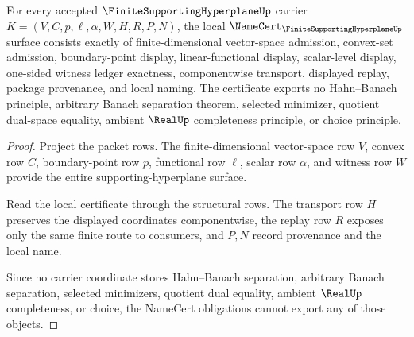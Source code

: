 \begin{theorem}
\label{thm:finite-supporting-hyperplane-obligations}
For every accepted $\FiniteSupportingHyperplaneUp$ carrier $K=(V,C,p,\ell,\alpha,W,H,R,P,N)$, the local $\NameCert_{\FiniteSupportingHyperplaneUp}$ surface consists exactly of finite-dimensional vector-space admission, convex-set admission, boundary-point display, linear-functional display, scalar-level display, one-sided witness ledger exactness, componentwise transport, displayed replay, package provenance, and local naming. The certificate exports no Hahn--Banach principle, arbitrary Banach separation theorem, selected minimizer, quotient dual-space equality, ambient $\RealUp$ completeness principle, or choice principle.
\end{theorem}
\begin{proof}
Project the packet rows. The finite-dimensional vector-space row $V$, convex row $C$, boundary-point row $p$, functional row $\ell$, scalar row $\alpha$, and witness row $W$ provide the entire supporting-hyperplane surface.

Read the local certificate through the structural rows. The transport row $H$ preserves the displayed coordinates componentwise, the replay row $R$ exposes only the same finite route to consumers, and $P,N$ record provenance and the local name.

Since no carrier coordinate stores Hahn--Banach separation, arbitrary Banach separation, selected minimizers, quotient dual equality, ambient $\RealUp$ completeness, or choice, the NameCert obligations cannot export any of those objects.
\end{proof}


\begin{closurestatus}{\FiniteSupportingHyperplaneUp}
  \theoryclosure{\obligationClosure}
  \formalstatus{\unformalizedV}
\end{closurestatus}
